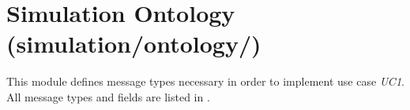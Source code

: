 \section{Simulation Ontology (simulation/ontology/)}
This module defines message types necessary in order to implement use case \textit{UC1}. All message types and fields are listed in .